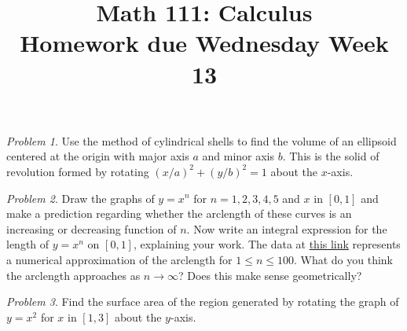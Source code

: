 \documentclass[11pt,twoside]{amsart}
\title{Math 111: Calculus\\ Homework due Wednesday Week 13}
\theoremstyle{plain}
\theoremstyle{remark}
\newtheorem{prob}{Problem}
\theoremstyle{definition}
\theoremstyle{definition}
\begin{document}
\maketitle

\begin{prob}
Use the method of cylindrical shells to find the volume of an ellipsoid centered at the origin with major axis $a$ and minor axis $b$. This is the solid of revolution formed by rotating $(x/a)^2+(y/b)^2=1$ about the $x$-axis.
\end{prob}

\begin{prob}
Draw the graphs of $y=x^n$ for $n=1,2,3,4,5$ and $x$ in $[0,1]$ and make a prediction regarding whether the arclength of these curves is an increasing or decreasing function of $n$. Now write an integral expression for the length of $y=x^n$ on $[0,1]$, explaining your work. The data at \href{https://sagecell.sagemath.org/?z=eJwFwUEKgCAQAMB70B-86ZbJ6ndEQ8JCsI02C5_fzJdYyS5hHDy9Z-aypboWavngVNVzc1N2puimHpWbaHEAGrUFj0HsFwsShYS3xljEEH7XhRdo&lang=sage&interacts=eJyLjgUAARUAuQ==}{this link} represents a numerical approximation of the arclength for $1\le n\le 100$. What do you think the arclength approaches as $n\to \infty$? Does this make sense geometrically?
\end{prob}

\begin{prob}
Find the surface area of the region generated by rotating the graph of $y=x^2$ for $x$ in $[1,3]$ about the $y$-axis.
\end{prob}
\end{document}
